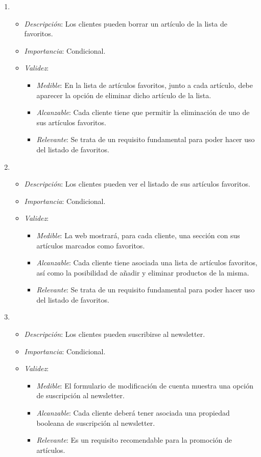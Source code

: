 \begin{enumerate}[{\bf RF-1}]
\item 
  \begin{itemize}
  \item \textit{Descripción}: Los clientes pueden borrar un artículo de la lista de favoritos.
  \item \textit{Importancia}: Condicional.
  \item \textit{Validez}:
    \begin{itemize}
    \item \textit{Medible}: En la lista de artículos favoritos, junto a cada artículo, debe aparecer la opción de eliminar dicho artículo de la lista.
    \item \textit{Alcanzable}: Cada cliente tiene que permitir la eliminación de uno de sus artículos favoritos.
    \item \textit{Relevante}: Se trata de un requisito fundamental para poder hacer uso del listado de favoritos.
    \end{itemize}
  \end{itemize}

\item 
  \begin{itemize}
  \item \textit{Descripción}: Los clientes pueden ver el listado de sus artículos favoritos.
  \item \textit{Importancia}: Condicional.
  \item \textit{Validez}:
    \begin{itemize}
    \item \textit{Medible}: La web mostrará, para cada cliente, una sección con sus artículos marcados como favoritos.
    \item \textit{Alcanzable}: Cada cliente tiene asociada una lista de artículos favoritos, así como la posibilidad de añadir y eliminar productos de la misma.
    \item \textit{Relevante}: Se trata de un requisito fundamental para poder hacer uso del listado de favoritos.
    \end{itemize}
  \end{itemize}

\item 
  \begin{itemize}
  \item \textit{Descripción}: Los clientes pueden suscribirse al newsletter.
  \item \textit{Importancia}: Condicional.
  \item \textit{Validez}:
    \begin{itemize}
    \item \textit{Medible}: El formulario de modificación de cuenta muestra una opción de suscripción al newsletter.
    \item \textit{Alcanzable}: Cada cliente deberá tener asociada una propiedad booleana de suscripción al newsletter.
    \item \textit{Relevante}: Es un requisito recomendable para la promoción de artículos.
    \end{itemize}
  \end{itemize}


\end{enumerate}
